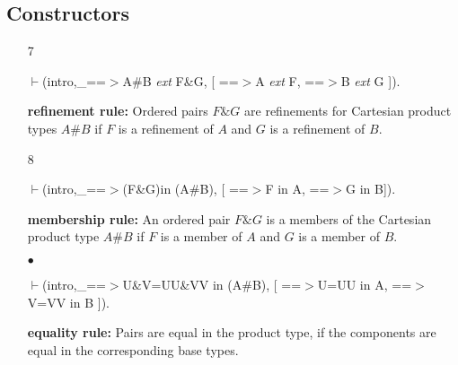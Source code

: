\documentclass[11pt]{report}
\begin{document}
 \subsection{Constructors}
 \begin{enumerate}
 \item[7]
\begin{sf}\begin{tabbing}
$\vdash$(intro,\_\hspace{0.1em}==$>$A\#B \mbox{\it ext} F\&G, [ ==$>$A \mbox{\it ext} F, ==$>$B \mbox{\it ext} G ]). 
\end{tabbing}\end{sf}

 {\bf refinement rule:}
 Ordered pairs $F\&G$ are refinements for Cartesian product types
 $A\#B$ if $F$ is a refinement of $A$ and $G$ is a refinement of $B$.
  
 \item[8]
\begin{sf}\begin{tabbing}
$\vdash$(intro,\_\hspace{0.1em}==$>$(F\&G)in (A\#B), [ ==$>$F in A, ==$>$G in B]).
\end{tabbing}\end{sf}

 {\bf membership rule:}  
 An ordered pair $F\&G$ is a members of the Cartesian product type
 $A\#B$ if $F$ is a member of $A$ and $G$ is a member of $B$.
  
 \item[$\bullet$]
\begin{sf}\begin{tabbing}
$\vdash$(intro,\_\hspace{0.1em}==$>$U\&V=UU\&VV in (A\#B), [ ==$>$U=UU in A, ==$>$V=VV in B ]).
\end{tabbing}\end{sf}

 {\bf equality rule:}
 Pairs are equal in the product type, if the components are equal
 in the corresponding base types.
 \end{enumerate}
  
\end{document}
